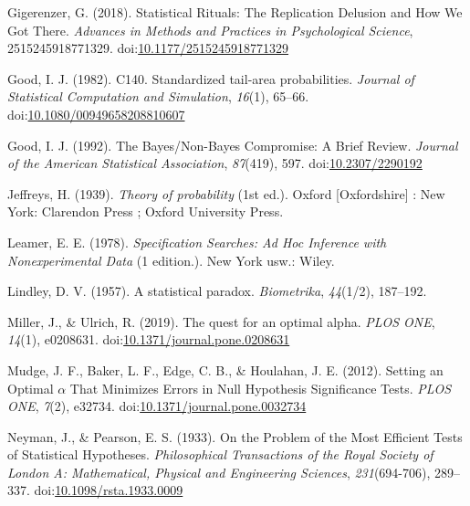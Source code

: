 \documentclass[,jou,floatsintext]{apa6}
\begin{document}
\leavevmode\hypertarget{ref-gigerenzer_statistical_2018}{}%
Gigerenzer, G. (2018). Statistical Rituals: The Replication Delusion and How We Got There. \emph{Advances in Methods and Practices in Psychological Science}, 2515245918771329. doi:\href{https://doi.org/10.1177/2515245918771329}{10.1177/2515245918771329}

\leavevmode\hypertarget{ref-good_c140._1982}{}%
Good, I. J. (1982). C140. Standardized tail-area probabilities. \emph{Journal of Statistical Computation and Simulation}, \emph{16}(1), 65--66. doi:\href{https://doi.org/10.1080/00949658208810607}{10.1080/00949658208810607}

\leavevmode\hypertarget{ref-good_bayesux2fnon-bayes_1992}{}%
Good, I. J. (1992). The Bayes/Non-Bayes Compromise: A Brief Review. \emph{Journal of the American Statistical Association}, \emph{87}(419), 597. doi:\href{https://doi.org/10.2307/2290192}{10.2307/2290192}

\leavevmode\hypertarget{ref-jeffreys_theory_1939}{}%
Jeffreys, H. (1939). \emph{Theory of probability} (1st ed.). Oxford {[}Oxfordshire{]} : New York: Clarendon Press ; Oxford University Press.

\leavevmode\hypertarget{ref-leamer_specification_1978}{}%
Leamer, E. E. (1978). \emph{Specification Searches: Ad Hoc Inference with Nonexperimental Data} (1 edition.). New York usw.: Wiley.

\leavevmode\hypertarget{ref-lindley_statistical_1957}{}%
Lindley, D. V. (1957). A statistical paradox. \emph{Biometrika}, \emph{44}(1/2), 187--192.

\leavevmode\hypertarget{ref-miller_quest_2019}{}%
Miller, J., \& Ulrich, R. (2019). The quest for an optimal alpha. \emph{PLOS ONE}, \emph{14}(1), e0208631. doi:\href{https://doi.org/10.1371/journal.pone.0208631}{10.1371/journal.pone.0208631}

\leavevmode\hypertarget{ref-mudge_setting_2012}{}%
Mudge, J. F., Baker, L. F., Edge, C. B., \& Houlahan, J. E. (2012). Setting an Optimal \(\alpha\) That Minimizes Errors in Null Hypothesis Significance Tests. \emph{PLOS ONE}, \emph{7}(2), e32734. doi:\href{https://doi.org/10.1371/journal.pone.0032734}{10.1371/journal.pone.0032734}

\leavevmode\hypertarget{ref-neyman_problem_1933}{}%
Neyman, J., \& Pearson, E. S. (1933). On the Problem of the Most Efficient Tests of Statistical Hypotheses. \emph{Philosophical Transactions of the Royal Society of London A: Mathematical, Physical and Engineering Sciences}, \emph{231}(694-706), 289--337. doi:\href{https://doi.org/10.1098/rsta.1933.0009}{10.1098/rsta.1933.0009}
\end{document}
